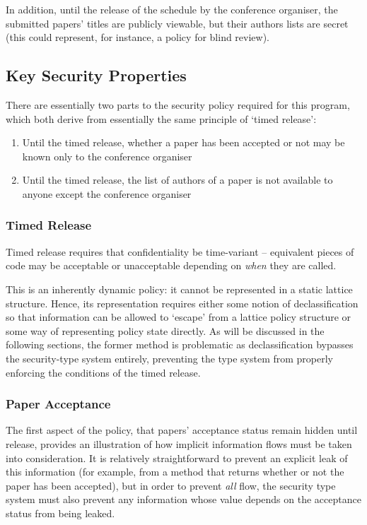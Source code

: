In addition, until the release of the schedule by the conference organiser, the submitted papers' titles are publicly viewable, but their authors lists are secret (this could represent, for instance, a policy for blind review).

\subsection{Key Security Properties}

There are essentially two parts to the security policy required for this program, which both derive from essentially the same principle of `timed release':

\begin{enumerate}
	\item Until the timed release, whether a paper has been accepted or not may be known only to the conference organiser
	
	\item Until the timed release, the list of authors of a paper is not available to anyone except the conference organiser
\end{enumerate}

\subsubsection{Timed Release}

Timed release requires that confidentiality be time-variant -- equivalent pieces of code may be acceptable or unacceptable depending on \textit{when} they are called.

This is an inherently dynamic policy: it cannot be represented in a static lattice structure. Hence, its representation requires either some notion of declassification so that information can be allowed to `escape' from a lattice policy structure or some way of representing policy state directly. As will be discussed in the following sections, the former method is problematic as declassification bypasses the security-type system entirely, preventing the type system from properly enforcing the conditions of the timed release.

\subsubsection{Paper Acceptance}

The first aspect of the policy, that papers' acceptance status remain hidden until release, provides an illustration of how implicit information flows must be taken into consideration. It is relatively straightforward to prevent an explicit leak of this information (for example, from a method that returns whether or not the paper has been accepted), but in order to prevent \textit{all} flow, the security type system must also prevent any information whose value depends on the acceptance status from being leaked.

